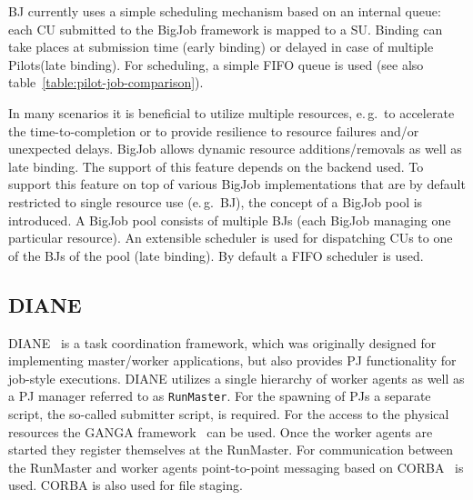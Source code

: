 \documentclass[conference,final]{IEEEtran}
\newcommand{\alnote}[1]{ {\textcolor{blue} { ***andreL: #1 }}}
\newcommand{\note}[1]{ {\textcolor{magenta} { ***Note: #1 }}}
\newcommand{\alnote}[1]{}
\newcommand{\note}[1]{}
\newcommand{\pilots}{Pilots\xspace}
\newcommand{\cu}{CU\xspace}
\newcommand{\cus}{CUs\xspace}
\newcommand{\upp}{\vspace*{-0.5em}}
\begin{document}
BJ currently uses a simple scheduling mechanism based on an internal queue: each
\cu submitted to the BigJob framework is mapped to a SU. Binding can take places
at submission time (early binding) or delayed in case of multiple \pilots (late
binding). For scheduling, a simple FIFO queue is used (see also
table~\ref{table:pilot-job-comparison}).



In many scenarios it is beneficial to utilize multiple resources, e.\,g.\ to
accelerate the time-to-completion or to provide resilience to resource failures
and/or unexpected delays. BigJob allows dynamic resource
additions/removals as well as late binding. The support of this feature depends
on the backend used. To support this feature on top of various BigJob
implementations that are by default restricted to single resource use (e.\,g.\
BJ), the concept of a BigJob pool is introduced. A BigJob pool consists of
multiple BJs (each BigJob managing one particular resource). An extensible
scheduler is used for dispatching \cus to one of the BJs of the pool (late
binding). By default a FIFO scheduler is used.


\upp
\subsection{DIANE\upp\upp}

DIANE~\cite{Moscicki:908910} is a task coordination framework, which
was originally designed for implementing master/worker applications,
but also provides PJ functionality for job-style executions. DIANE
utilizes a single hierarchy of worker agents as well as a PJ manager
referred to as \texttt{RunMaster}.
For the spawning of PJs a separate script, the so-called submitter script, is
required. For the access to the physical resources the GANGA
framework~\cite{Moscicki20092303} can be used.
Once the worker agents are started they register themselves at the RunMaster.
For communication between the RunMaster and worker agents point-to-point
messaging based on CORBA~\cite{OMG-CORBA303:2004} is used. CORBA is also used
for file staging.
\end{document}
